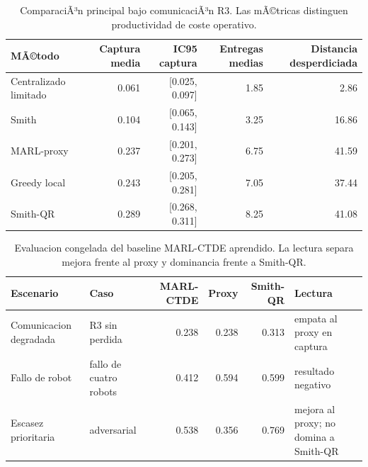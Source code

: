 \begin{table}[H]
\centering
\caption{ComparaciÃ³n principal bajo comunicaciÃ³n R3. Las mÃ©tricas distinguen productividad de coste operativo.}
\label{tab:validation-suite-r3}
\small
\begin{tabularx}{\textwidth}{@{}>{\raggedright\arraybackslash}Xrrrr@{}}
\toprule
MÃ©todo & Captura media & IC95 captura & Entregas medias & Distancia desperdiciada \\
\midrule
Centralizado limitado & 0.061 & [0.025, 0.097] & 1.85 & 2.86 \\
Smith & 0.104 & [0.065, 0.143] & 3.25 & 16.86 \\
MARL-proxy & 0.237 & [0.201, 0.273] & 6.75 & 41.59 \\
Greedy local & 0.243 & [0.205, 0.281] & 7.05 & 37.44 \\
Smith-QR & 0.289 & [0.268, 0.311] & 8.25 & 41.08 \\
\bottomrule
\end{tabularx}
\end{table}

\begin{table}[H]
\centering
\caption{Evaluacion congelada del baseline MARL-CTDE aprendido. La lectura separa mejora frente al proxy y dominancia frente a Smith-QR.}
\label{tab:validation-suite-marl-ctde}
\small
\begin{tabularx}{\textwidth}{@{}>{\raggedright\arraybackslash}p{}>{\raggedright\arraybackslash}p{}rrr>{\raggedright\arraybackslash}X@{}}
\toprule
Escenario & Caso & MARL-CTDE & Proxy & Smith-QR & Lectura \\
\midrule
Comunicacion degradada & R3 sin perdida & 0.238 & 0.238 & 0.313 & empata al proxy en captura \\
Fallo de robot & fallo de cuatro robots & 0.412 & 0.594 & 0.599 & resultado negativo \\
Escasez prioritaria & adversarial & 0.538 & 0.356 & 0.769 & mejora al proxy; no domina a Smith-QR \\
\bottomrule
\end{tabularx}
\end{table}


